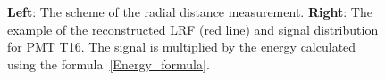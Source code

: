 \documentclass[a4paper,11pt]{article}
\begin{document}
\begin{figure}[htbp]
  \begin{minipage}[ht]{0.36\linewidth}    
  \end{minipage}
  \hfill
  \begin{minipage}[ht]{0.62\linewidth}  
  \end{minipage}
	\caption{\textbf{Left}: The scheme of the radial distance measurement. \textbf{Right}: The example of the reconstructed LRF (red line) and signal distribution for PMT T16. The signal is multiplied by the energy calculated using the formula~\ref{Energy_formula}.}
	\label{img:xy_and_lrf}
\end{figure}
\end{document}
